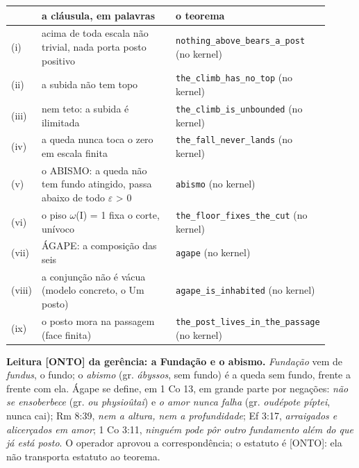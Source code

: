 \documentclass[11pt]{article}
\theoremstyle{definition}\newtheorem{deriv}{Derivação}
\begin{document}
\begin{center}\small\begin{tabular}{p{0.05\linewidth}p{0.5\linewidth}p{0.36\linewidth}}\hline & a cláusula, em palavras & o teorema \\ \hline (i) & acima de toda escala não trivial, nada porta posto positivo & \texttt{nothing\_\allowbreak{}above\_\allowbreak{}bears\_\allowbreak{}a\_\allowbreak{}post} (no kernel) \\ (ii) & a subida não tem topo & \texttt{the\_\allowbreak{}climb\_\allowbreak{}has\_\allowbreak{}no\_\allowbreak{}top} (no kernel) \\ (iii) & nem teto: a subida é ilimitada & \texttt{the\_\allowbreak{}climb\_\allowbreak{}is\_\allowbreak{}unbounded} (no kernel) \\ (iv) & a queda nunca toca o zero em escala finita & \texttt{the\_\allowbreak{}fall\_\allowbreak{}never\_\allowbreak{}lands} (no kernel) \\ (v) & o ABISMO: a queda não tem fundo atingido, passa abaixo de todo $\varepsilon$ > 0 & \texttt{abismo} (no kernel) \\ (vi) & o piso $\omega$(I) = 1 fixa o corte, unívoco & \texttt{the\_\allowbreak{}floor\_\allowbreak{}fixes\_\allowbreak{}the\_\allowbreak{}cut} (no kernel) \\ (vii) & ÁGAPE: a composição das seis & \texttt{agape} (no kernel) \\ (viii) & a conjunção não é vácua (modelo concreto, o Um posto) & \texttt{agape\_\allowbreak{}is\_\allowbreak{}inhabited} (no kernel) \\ (ix) & o posto mora na passagem (face finita) & \texttt{the\_\allowbreak{}post\_\allowbreak{}lives\_\allowbreak{}in\_\allowbreak{}the\_\allowbreak{}passage} (no kernel) \\ \hline\end{tabular}\end{center}

\textbf{Leitura \textsf{[ONTO]} da gerência: a Fundação e o abismo.} \emph{Fundação} vem de \emph{fundus}, o fundo; o \emph{abismo} (gr. \emph{ábyssos}, sem fundo) é a queda sem fundo, frente a frente com ela. Ágape se define, em 1 Co 13, em grande parte por negações: \emph{não se ensoberbece} (gr. \emph{ou physioûtai}) e \emph{o amor nunca falha} (gr. \emph{oudépote píptei}, nunca cai); Rm 8:39, \emph{nem a altura, nem a profundidade}; Ef 3:17, \emph{arraigados e alicerçados em amor}; 1 Co 3:11, \emph{ninguém pode pôr outro fundamento além do que já está posto}. O operador aprovou a correspondência; o estatuto é \textsf{[ONTO]}: ela não transporta estatuto ao teorema.
\end{document}
